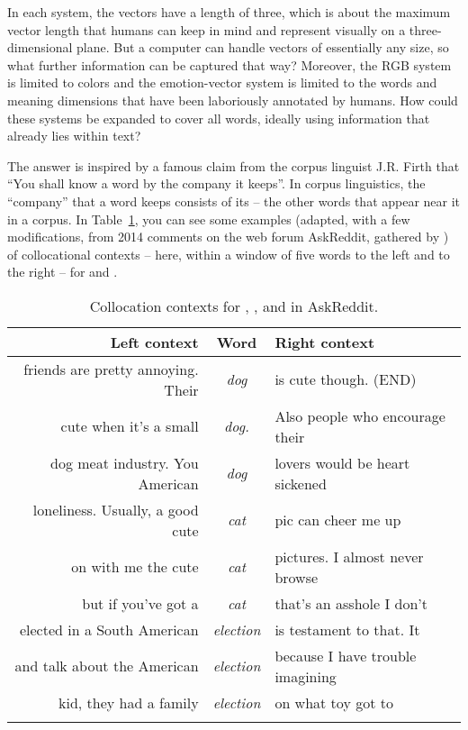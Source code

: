 In each system, the vectors have a length of three, which is about the
maximum vector length that humans can keep in mind and represent
visually on a three-dimensional plane.  But
a computer can handle vectors of essentially any size, so what further
information can be captured that way?  Moreover, the RGB system is
limited to colors and the emotion-vector system is limited to the
words and meaning dimensions that have been laboriously annotated by
humans.  How could these systems be expanded to cover all words, ideally using
information that already lies within text?

The answer is inspired by a famous claim from the corpus linguist
J.R. Firth \citep{Firth:1957} that ``You shall know a word by the company it keeps''.  In
corpus linguistics, the ``company'' that a word keeps consists of its
 -- the other words that appear near it in a
corpus.  In Table~\ref{tab:collocation-contexts}, you can see some
examples (adapted, with a few modifications, from 2014 comments on the
web forum AskReddit, gathered by \citealt{Baumgartner-etal:2020}) of
collocational contexts -- here, within a window of five words to the
left and to the right -- for  and .

\begin{table}
\small
\begin{tabular}{rcl}
\lsptoprule
Left context &  Word & Right context \\ \midrule
friends are pretty annoying. Their  & \emph{dog} & is cute though. (END) \\
cute when it's a small & \emph{dog.} & Also people who encourage their  \\
dog meat industry. You American & \emph{dog} & lovers would be heart sickened  \\  \midrule 
loneliness. Usually, a good cute & \emph{cat} & pic can cheer me up \\
on with me the cute & \emph{cat} & pictures. I almost never browse  \\
but if you've got a & \emph{cat} & that's an asshole I don't \\ \midrule
 elected in a South American & \emph{election} & is testament to that. It \\
and talk about the American & \emph{election} & because I have trouble imagining  \\
kid, they had a family & \emph{election} & on what toy got to \\  
\lspbottomrule
\end{tabular}
\caption{Collocation contexts for , , and  in AskReddit.}
\label{tab:collocation-contexts}
\end{table}

